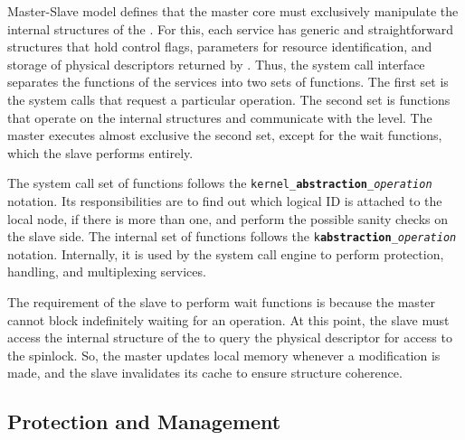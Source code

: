 
			Master-Slave model defines that the master core must exclusively manipulate
			the internal structures of the \os. For this, each service has generic and
			straightforward structures that hold control flags, parameters for resource
			identification, and storage of physical descriptors returned by \hal. Thus,
			the system call interface separates the functions of the services into two
			sets of functions. The first set is the system calls that request a particular
			operation. The second set is functions that operate on the internal structures
			and communicate with the \hal level. The master executes almost exclusive
			the second set, except for the wait functions, which the slave performs entirely.

			The system call set of functions follows the \texttt{kernel\_\textbf{abstraction}\_\textit{operation}}
			notation. Its responsibilities are to find out which logical ID is attached to
			the local node, if there is more than one, and perform the possible sanity
			checks on the slave side. The internal set of functions follows the
			\texttt{k\textbf{abstraction}\_\textit{operation}} notation. Internally, it
			is used by the system call engine to perform protection, handling, and
			multiplexing services. 

			The requirement of the slave to perform wait functions is because the master
			cannot block indefinitely waiting for an operation. At this point, the slave
			must access the internal structure of the \os to query the physical descriptor
			for access to the \hal spinlock. So, the master updates local memory whenever
			a modification is made, and the slave invalidates its cache to ensure structure
			coherence.

		\subsection{Protection and Management}

			
